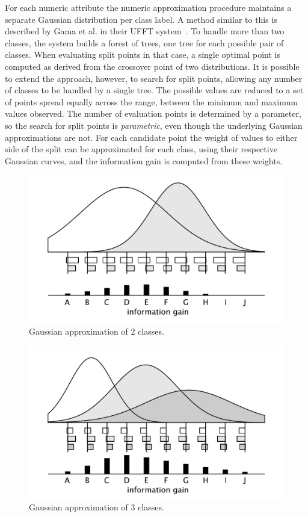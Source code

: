 For each numeric attribute the numeric approximation procedure maintains a separate Gaussian distribution per class label. A method similar to this is described by Gama et al. in their UFFT system~\cite{ufft}.
To handle more than two classes, the system builds a forest of trees,
one tree for each possible pair of classes.
When evaluating split points in that case, a single optimal point is computed as derived from the crossover point of two distributions. It is possible to extend the approach, however, to search for split points, allowing any number of classes
to be handled by a single tree.
The possible values are reduced to a set of points spread equally across the range, between the minimum and maximum values observed. The number of evaluation points is determined by a parameter, so the search for split points is {\em parametric}, even though the underlying Gaussian approximations are not. For each candidate point the weight of values to either side of the split can be approximated for each class, using their respective Gaussian curves, and the information gain is computed from these weights.

\begin{figure}
\includegraphics[width=\linewidth]{figures/gaussian2class}
\caption{Gaussian approximation of 2 classes.}
\label{fig:gaussian2class}
\end{figure}

\begin{figure}
\includegraphics[width=\linewidth]{figures/gaussian3class}
\caption{Gaussian approximation of 3 classes.}
\label{fig:gaussian3class}
\end{figure}

